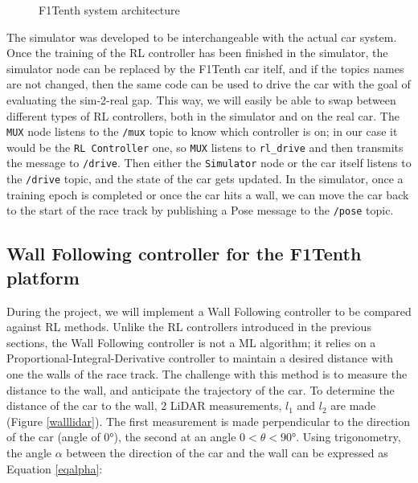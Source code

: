 \begin{figure}[H]
\caption{F1Tenth system architecture}
\label{f1tenth}
\end{figure}

The simulator was developed to be interchangeable with the actual car system. Once the training of the RL controller has been finished in the simulator, the simulator node can be replaced by the F1Tenth car itelf, and if the topics names are not changed, then the same code can be used to drive the car with the goal of evaluating the sim-2-real gap. This way, we will easily be able to swap between different types of RL controllers, both in the simulator and on the real car. The \verb |MUX| node listens to the \verb |/mux| topic to know which controller is on; in our case it would be the \verb |RL Controller| one, so \verb |MUX| listens to \verb |rl_drive| and then transmits the message to \verb |/drive|. Then either the \verb |Simulator| node or the car itself listens to the \verb |/drive| topic, and the state of the car gets updated. In the simulator, once a training epoch is completed or once the car hits a wall, we can move the car back to the start of the race track by publishing a Pose message to the \verb |/pose| topic.


\subsection{Wall Following controller for the F1Tenth platform}

During the project, we will implement a Wall Following controller to be compared against RL methods. Unlike the RL controllers introduced in the previous sections, the Wall Following controller is not a ML algorithm; it relies on a Proportional-Integral-Derivative controller to maintain a desired distance with one the walls of the race track. The challenge with this method is to measure the distance to the wall, and anticipate the trajectory of the car. To determine the distance of the car to the wall, 2 LiDAR measurements, $l_1$ and $l_2$ are made (Figure \ref{walllidar}). The first measurement is made perpendicular to the direction of the car (angle of 0°), the second at an angle $0 < \theta < 90°$. Using trigonometry, the angle $\alpha$ between the direction of the car and the wall can be expressed as Equation \ref{eqalpha}:

